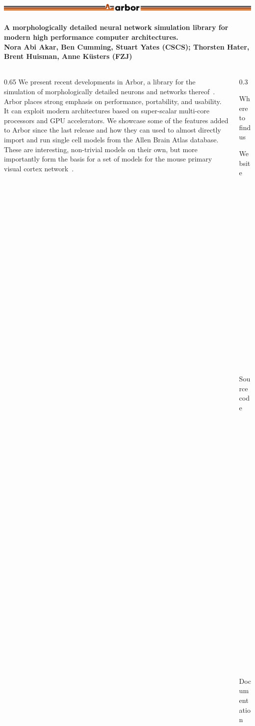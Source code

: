 \documentclass{beamer}
\begin{document}
\begin{frame}[t, fragile]
  \frametitle{\includegraphics[width=0.66\linewidth]{img/arbor-lines-proto-colour-full}}
  \framesubtitle{A morphologically detailed neural network simulation library for modern high performance computer architectures.\\
    \tiny{Nora Abi Akar, Ben Cumming, Stuart Yates (CSCS); Thorsten Hater, Brent Huisman, Anne Küsters (FZJ)}}

  \begin{columns}[onlytextwidth,T]
    \begin{column}{0.65\textwidth}
      We present recent developments in Arbor, a library for the simulation of
      morphologically detailed neurons and networks thereof~\cite{arbor}. Arbor
      places strong emphasis on performance, portability, and usability. It can
      exploit modern architectures based on super-scalar multi-core processors
      and GPU accelerators. We showcase some of the features added to Arbor
      since the last release and how they can used to almost directly import and
      run single cell models from the Allen Brain Atlas database. These are
      interesting, non-trivial models on their own, but more importantly form
      the basis for a set of models for the mouse primary visual cortex
      network~\cite{allen-v1}.
    \end{column}
    \begin{column}{0.3\textwidth}
      \begin{block}{Where to find us}
        \begin{description}
          \item[Website] \href{https://arbor-sim.github.i}{arbor-sim.github.io}
          \item[Source code] \href{https://github.com/arbor-sim/arbor}{github.com/arbor-sim/arbor}
          \item[Documentation] \href{https://arbor.readthedocs.io}{arbor.readthedocs.io}
          \item[Contact] \href{mailto:arbor-sim@fz-juelich.de}{arbor-sim@fz-juelich.de}
        \end{description}
      \end{block}
    \end{column}
  \end{columns}
  \vspace*{-2ex}
  \textbf{{\large{}}}\\


\end{frame}
\end{document}
